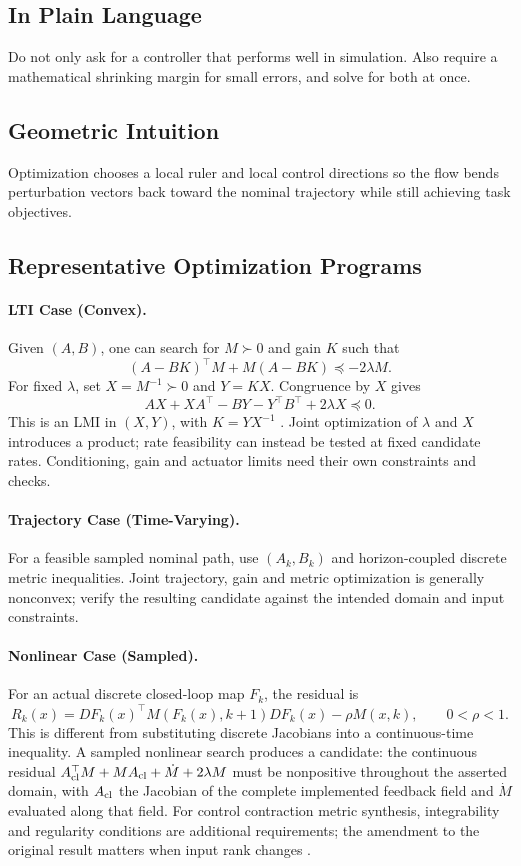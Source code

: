 \documentclass[11pt,letterpaper]{article}
\begin{document}
\subsection{In Plain Language}
Do not only ask for a controller that performs well in simulation. Also require a mathematical shrinking margin for small errors, and solve for both at once.

\subsection{Geometric Intuition}
Optimization chooses a local ruler and local control directions so the flow bends perturbation vectors back toward the nominal trajectory while still achieving task objectives.

\subsection{Representative Optimization Programs}
\paragraph{LTI Case (Convex).}
Given $(A,B)$, one can search for $M\succ0$ and gain $K$ such that
\begin{equation}
(A-BK)^\top M + M(A-BK) \preceq -2\lambda M.
\label{eq:lti-contraction-synthesis}
\end{equation}
For fixed $\lambda$, set $X=M^{-1}\succ0$ and $Y=KX$. Congruence by $X$ gives
\[
AX+XA^\top-BY-Y^\top B^\top+2\lambda X\preceq0.
\]
This is an LMI in $(X,Y)$, with $K=YX^{-1}$ \citep{boyd1994}. Joint optimization of $\lambda$ and $X$ introduces a product; rate feasibility can instead be tested at fixed candidate rates. Conditioning, gain and actuator limits need their own constraints and checks.

\paragraph{Trajectory Case (Time-Varying).}
For a feasible sampled nominal path, use $(A_k,B_k)$ and horizon-coupled discrete metric inequalities. Joint trajectory, gain and metric optimization is generally nonconvex; verify the resulting candidate against the intended domain and input constraints.

\paragraph{Nonlinear Case (Sampled).}
For an actual discrete closed-loop map $F_k$, the residual is
\[
R_k(x)=D F_k(x)^\top M(F_k(x),k+1)D F_k(x)-\rho M(x,k),
\qquad 0<\rho<1.
\]
This is different from substituting discrete Jacobians into a continuous-time inequality. A sampled nonlinear search produces a candidate: the continuous residual $A_{\rm cl}^\top M+MA_{\rm cl}+\dot M+2\lambda M$ must be nonpositive throughout the asserted domain, with $A_{\rm cl}$ the Jacobian of the complete implemented feedback field and $\dot M$ evaluated along that field. For control contraction metric synthesis, integrability and regularity conditions are additional requirements; the amendment to the original result matters when input rank changes \citep{manchester2017ccm,manchester2017amendment}.
\end{document}
